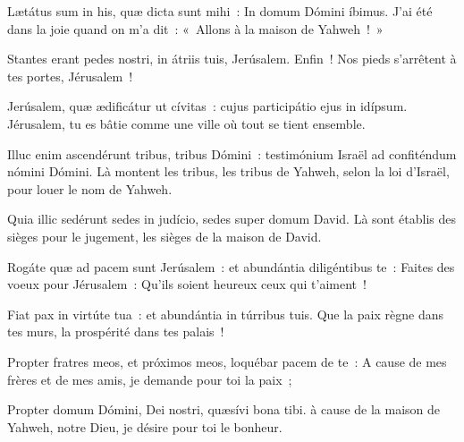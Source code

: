 \begin{paracol}{2}

\LigneParacol{0cm}
{Lætátus sum in his, quæ dicta sunt mihi~: \GreStar{} In domum Dómini íbimus.}
{J'ai été dans la joie quand on m'a dit~: «~Allons à la maison de Yahweh~!~»}

\LigneParacol{0.2cm}
{Stantes erant pedes nostri, \GreStar{} in átriis tuis, Jerúsalem.}
{Enfin~! Nos pieds s'arrêtent à tes portes, Jérusalem~!}

\LigneParacol{0.2cm}
{Jerúsalem, quæ ædificátur ut cívitas~: \GreStar{} cujus participátio ejus in idípsum.}
{Jérusalem, tu es bâtie comme une ville où tout se tient ensemble.}

\LigneParacol{0.2cm}
{Illuc enim ascendérunt tribus, tribus Dómini~: \GreStar{} testimónium Israël ad confiténdum nómini Dómini.}
{Là montent les tribus, les tribus de Yahweh, selon la loi d'Israël, pour louer le nom de Yahweh.}

\LigneParacol{0.2cm}
{Quia illic sedérunt sedes in judício, \GreStar{} sedes super domum David.}
{Là sont établis des sièges pour le jugement, les sièges de la maison de David.}

\LigneParacol{0.2cm}
{Rogáte quæ ad pacem sunt Jerúsalem~: \GreStar{} et abundántia diligéntibus te~:}
{Faites des voeux pour Jérusalem~: Qu'ils soient heureux ceux qui t'aiment~!}

\LigneParacol{0.2cm}
{Fiat pax in virtúte tua~: \GreStar{} et abundántia in túrribus tuis.}
{Que la paix règne dans tes murs, la prospérité dans tes palais~!}

\LigneParacol{0.2cm}
{Propter fratres meos, et próximos meos, \GreStar{} loquébar pacem de te~:}
{A cause de mes frères et de mes amis, je demande pour toi la paix~;}

\LigneParacol{0.2cm}
{Propter domum Dómini, Dei nostri, \GreStar{} quæsívi bona tibi.}
{à cause de la maison de Yahweh, notre Dieu, je désire pour toi le bonheur. }

\end{paracol}
